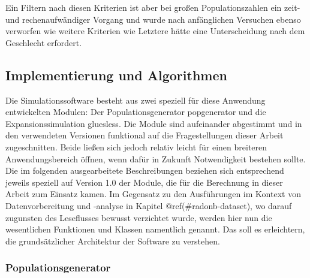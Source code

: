 \documentclass[openany,twoside,twocolumn]{book}
\begin{document}
Ein Filtern nach diesen Kriterien ist aber bei großen Populationszahlen
ein zeit- und rechenaufwändiger Vorgang und wurde nach anfänglichen
Versuchen ebenso verworfen wie weitere Kriterien wie Letztere hätte eine
Unterscheidung nach dem Geschlecht erfordert.

\hypertarget{implementierung-und-algorithmen}{%
\subsection{Implementierung und
Algorithmen}\label{implementierung-und-algorithmen}}

Die Simulationssoftware besteht aus zwei speziell für diese Anwendung
entwickelten Modulen: Der Populationsgenerator popgenerator und die
Expansionssimulation gluesless. Die Module sind aufeinander abgestimmt
und in den verwendeten Versionen funktional auf die Fragestellungen
dieser Arbeit zugeschnitten. Beide ließen sich jedoch relativ leicht für
einen breiteren Anwendungsbereich öffnen, wenn dafür in Zukunft
Notwendigkeit bestehen sollte. Die im folgenden ausgearbeitete
Beschreibungen beziehen sich entsprechend jeweils speziell auf Version
1.0 der Module, die für die Berechnung in dieser Arbeit zum Einsatz
kamen. Im Gegensatz zu den Ausführungen im Kontext von Datenvorbereitung
und -analyse in Kapitel @ref(\#radonb-dataset), wo darauf zugunsten des
Leseflusses bewusst verzichtet wurde, werden hier nun die wesentlichen
Funktionen und Klassen namentlich genannt. Das soll es erleichtern, die
grundsätzlicher Architektur der Software zu verstehen.

\hypertarget{populationsgenerator}{%
\subsubsection{Populationsgenerator}\label{populationsgenerator}}
\end{document}

